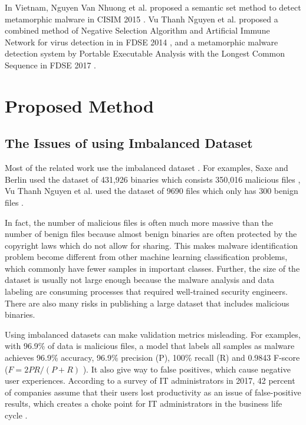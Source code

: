 \documentclass[runningheads]{llncs}
\begin{document}
In Vietnam, Nguyen Van Nhuong et al. proposed a semantic set method to detect metamorphic malware in CISIM 2015 \cite{van2014semantic}. Vu Thanh Nguyen et al. proposed a combined method of Negative Selection Algorithm and Artificial Immune Network for virus detection in in FDSE 2014 \cite{nguyen2014combination}, and a metamorphic malware detection system by Portable Executable Analysis with the Longest Common Sequence in FDSE 2017 \cite{vu2017metamorphic}.

\section{Proposed Method}

\subsection{The Issues of using Imbalanced Dataset}

Most of the related work use the imbalanced dataset \cite{saxe2015deep,vu2017metamorphic}. For examples, Saxe and Berlin used the dataset of 431,926 binaries which consists 350,016 malicious files \cite{saxe2015deep}, Vu Thanh Nguyen et al. used the dataset of 9690 files which only has 300 benign files \cite{vu2017metamorphic}. 

In fact, the number of malicious files is often much more massive than the number of benign files because almost benign binaries are often protected by the copyright laws which do not allow for sharing. This makes malware identification problem become different from other machine learning classification problems, which commonly have fewer samples in important classes. Further, the size of the dataset is usually not large enough because the malware analysis and data labeling are consuming processes that required well-trained security engineers. There are also many risks in publishing a large dataset that includes malicious binaries. 

Using imbalanced datasets can make validation metrics misleading.
For examples, with 96.9\% of data is malicious files, a model that labels all samples as malware achieves 96.9\% accuracy, 96.9\% precision (P), 100\% recall (R) and 0.9843 F-score ($F =  2PR / (P + R) $ \cite{chinchor1992muc}).
It also give way to false positives, which cause negative user experiences.
According to a survey of IT administrators in 2017, 42 percent of companies assume that their users lost productivity as an issue of false-positive results, which creates a choke point for IT administrators in the business life cycle \cite{jonathan2017survey}.
\end{document}
